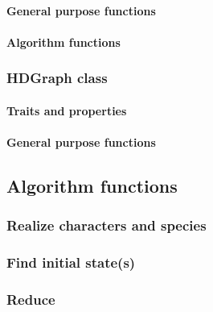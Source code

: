 \paragraph{General purpose functions}

\paragraph{Algorithm functions}

\subsubsection{HDGraph class}\label{section:hdgraph-class}

\paragraph{Traits and properties}

\paragraph{General purpose functions}

\subsection{Algorithm functions}\label{section:algorithm-functions}

\subsubsection{Realize characters and species}\label{section:realize}

\subsubsection{Find initial state(s)}\label{section:initial-state}

\subsubsection{Reduce}\label{section:reduce}
